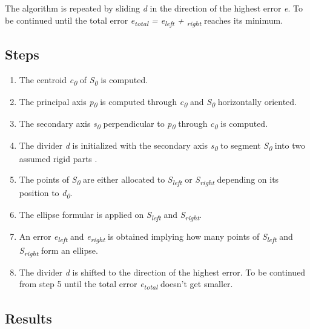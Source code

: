 \documentclass[a4paper,english,11pt]{report}
\begin{document}
The algorithm is repeated by sliding \textit{d} in the direction of the highest error \textit{e}. To be continued until the total error \textit{e\textsubscript{total} = e\textsubscript{left} + \textsubscript{right}} reaches its minimum.

\subsection{Steps}

\begin{enumerate}
	\item The centroid \textit{c\textsubscript{0}}  of \textit{S\textsubscript{0}} is computed.
	
	\item The principal axis \textit{p\textsubscript{0}} is computed through \textit{c\textsubscript{0}} and \textit{S\textsubscript{0}} horizontally oriented. 
	
	\item The secondary axis \textit{s\textsubscript{0}}  perpendicular to \textit{p\textsubscript{0}} through \textit{c\textsubscript{0}} is computed.
	
	\item The divider \textit{d} is initialized with the secondary axis \textit{s\textsubscript{0}} to segment \textit{S\textsubscript{0}} into two assumed rigid parts .
	
	\item The points of \textit{S\textsubscript{0}} are either allocated to \textit{S\textsubscript{left}} or \textit{S\textsubscript{right}} depending on its position to \textit{d\textsubscript{0}}.
	
	\item The ellipse formular is applied on \textit{S\textsubscript{left}} and \textit{S\textsubscript{right}}.
	
	\item An error \textit{e\textsubscript{left}} and \textit{e\textsubscript{right}} is obtained implying how many points of \textit{S\textsubscript{left}} and \textit{S\textsubscript{right}} form an ellipse. 
	
	\item The divider \textit{d} is shifted to the direction of the highest error. To be continued from step 5 until the total error \textit{e\textsubscript{total}} doesn't get smaller. 
\end{enumerate}

\subsection{Results}
\end{document}
